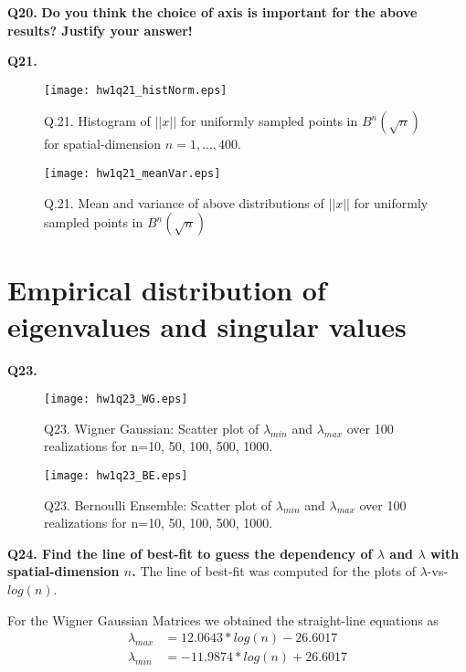 \documentclass[11pt]{article}
\begin{document}
  
    \textbf{Q20. }
\textbf{Do you think the choice of axis is important for the above results? Justify your answer!}

    
     \textbf{Q21. }
     
\begin{figure}[h!]
\centering
\texttt{[image: hw1q21\_histNorm.eps]}\\
\caption{Q.21. Histogram of $||x||$ for uniformly sampled points in $B^n(\sqrt{n})$ for spatial-dimension $n = {1, ..., 400}$.}
\label{fig:que21_histNorm}
\end{figure}

\begin{figure}[h!]
\centering
\texttt{[image: hw1q21\_meanVar.eps]}\\
\caption{Q.21. Mean and variance of above distributions of $||x||$ for uniformly sampled points in $B^n(\sqrt{n})$}
\label{fig:que21_meanVar}
\end{figure}

 
 \section{Empirical distribution of eigenvalues and singular values}
 
\textbf{Q23. }

\begin{figure}[h!]
\centering
\texttt{[image: hw1q23\_WG.eps]}\\
\caption{Q23. Wigner Gaussian: Scatter plot of $\lambda_{min}$ and $\lambda_{max}$ over 100 realizations for n={10, 50, 100, 500, 1000}. }
\label{fig:que23_WG}
\end{figure}

\begin{figure}[h!]
\centering
\texttt{[image: hw1q23\_BE.eps]}\\
\caption{Q23. Bernoulli Ensemble: Scatter plot of $\lambda_{min}$ and $\lambda_{max}$ over 100 realizations for n={10, 50, 100, 500, 1000}. }
\label{fig:que23_BE}
\end{figure}





\textbf{Q24. Find the line of best-fit to guess the dependency of $\lambda$ and $\lambda$ with spatial-dimension $n$. }
The line of best-fit was computed for the plots of $\lambda$-vs-$log(n)$.

For the Wigner Gaussian Matrices we obtained the straight-line equations as
\begin{align*}
\lambda_{max} &= 12.0643 *log(n) -26.6017 \\
\lambda_{min} &= -11.9874 *log(n) + 26.6017 
\end{align*}
\end{document}
